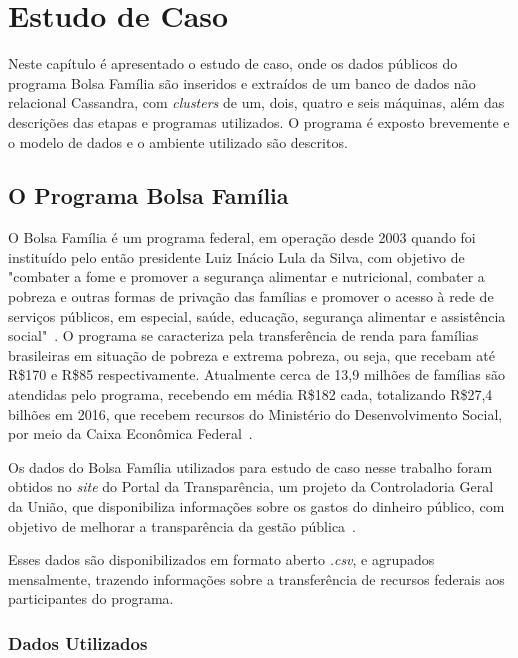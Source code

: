 

\chapter{Estudo de Caso}

Neste capítulo é apresentado o estudo de caso, onde os dados públicos do programa Bolsa Família são inseridos e extraídos de um banco de dados não relacional Cassandra, com \emph{clusters} de um, dois, quatro e seis máquinas, além das descrições das etapas e programas utilizados. O programa é exposto brevemente e o modelo de dados e o ambiente utilizado são descritos.

\section{O Programa Bolsa Família}
O Bolsa Família é um programa federal, em operação desde 2003 quando foi instituído pelo então presidente Luiz Inácio Lula da Silva, com objetivo de "combater a fome e promover a segurança alimentar e nutricional, combater a pobreza e outras formas de privação das famílias e promover o acesso à rede de serviços públicos, em especial, saúde, educação, segurança alimentar e assistência social"~\cite{caixa-bolsafamilia}. 
O programa se caracteriza pela transferência de renda para famílias brasileiras em situação de pobreza e extrema pobreza, ou seja, que recebam até R\$170 e R\$85 respectivamente. Atualmente cerca de 13,9 milhões de famílias são atendidas pelo programa, recebendo em média R\$182 cada, totalizando R\$27,4 bilhões em 2016, que recebem recursos do Ministério do Desenvolvimento Social, por meio da Caixa Econômica Federal~\cite{gov-bolsafamilia1, gov-bolsafamilia2}.

Os dados do Bolsa Família utilizados para estudo de caso nesse trabalho foram obtidos no \emph{site} do Portal da Transparência, um projeto da Controladoria Geral da União, que disponibiliza informações sobre os gastos do dinheiro público, com objetivo de melhorar a transparência da gestão pública~\cite{sobreportaldatransparencia}. 

Esses dados são disponibilizados em formato aberto \emph{.csv}, e agrupados mensalmente, trazendo informações sobre a transferência de recursos federais aos participantes do programa. 

\subsection{Dados Utilizados}

